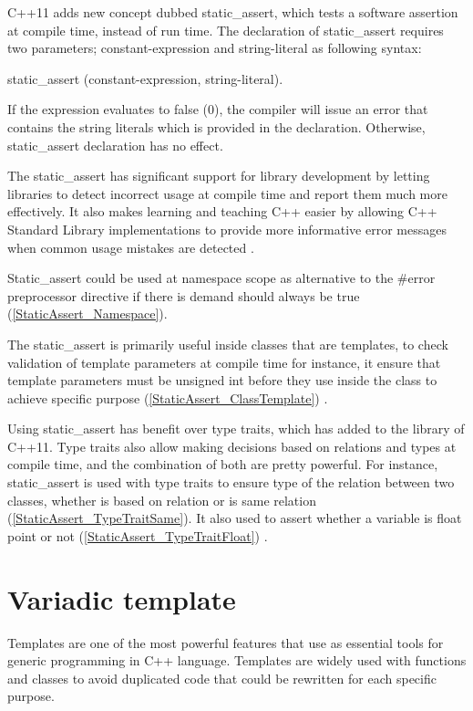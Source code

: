 \documentclass[11pt]{report}
\begin{document}
C++11 adds new concept dubbed static\_assert, which tests a software assertion at compile time, instead of run time. The declaration of static\_assert requires two parameters; constant-expression and string-literal as following syntax:
\begin{center}
static\_assert (constant-expression, string-literal).
\end{center}

If the expression evaluates to false (0), the compiler will issue an error that contains the string literals which is provided in the declaration. Otherwise, static\_assert declaration has no effect.


The static\_assert has significant support for library development by letting libraries to detect incorrect usage at compile time and report them much more effectively. It also makes learning and teaching C++ easier by allowing C++ Standard Library implementations to provide more informative error messages when common usage mistakes are detected \cite{MSDN:2012:CppModern}.


Static\_assert could be used at namespace scope as alternative to the \#error preprocessor directive if there is demand should always be true (\ref{StaticAssert_Namespace}).


The static\_assert is primarily useful inside classes that are templates, to check validation of template parameters at compile time for instance, it ensure that template parameters must be unsigned int before they use inside the class  to achieve specific purpose (\ref{StaticAssert_ClassTemplate}) \cite{Deitel:2012:CPP}.


Using static\_assert has benefit over type traits, which has added to the library of C++11. Type traits also allow making decisions based on relations and types at compile time, and the combination of both are pretty powerful. For instance, static\_assert is used with type traits to ensure type of the relation between two classes, whether is based on relation or is same relation (\ref{StaticAssert_TypeTraitSame}). It also used to assert whether a variable is float point or not (\ref{StaticAssert_TypeTraitFloat}) \cite{Gregorie:professionalcpp}.

\section{Variadic template}
\label{section: Variadic template}
Templates are one of the most powerful features that use as essential tools for generic programming in C++ language. Templates are widely used with functions and classes to avoid duplicated code that could be rewritten for each specific purpose.
\end{document}
